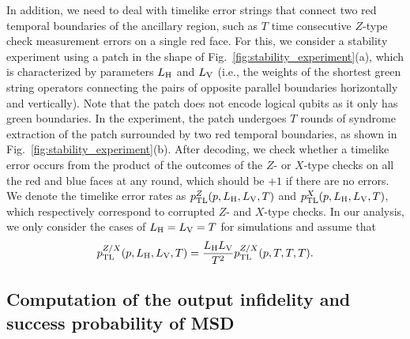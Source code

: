 \documentclass[
 prx,
 reprint,
 superscriptaddress,
 longbibliography,
 dvipsnames
]{revtex4-2}
\begin{document}
In addition, we need to deal with timelike error strings that connect two red temporal boundaries of the ancillary region, such as $T$ time consecutive $Z$-type check measurement errors on a single red face.
For this, we consider a stability experiment \cite{gidney2022stability} using a patch in the shape of Fig.~\ref{fig:stability_experiment}(a), which is characterized by parameters $L_{\mathrm{H}}$ and $L_{\mathrm{V}}$ (i.e., the weights of the shortest green string operators connecting the pairs of opposite parallel boundaries horizontally and vertically).
Note that the patch does not encode logical qubits as it only has green boundaries.
In the experiment, the patch undergoes $T$ rounds of syndrome extraction of the patch surrounded by two red temporal boundaries, as shown in Fig.~\ref{fig:stability_experiment}(b).
After decoding, we check whether a timelike error occurs from the product of the outcomes of the $Z$- or $X$-type checks on all the red and blue faces at any round, which should be $+1$ if there are no errors.
We denote the timelike error rates as $p_{\mathrm{TL}}^{Z}(p, L_{\mathrm{H}}, L_{\mathrm{V}}, T)$ and $p_{\mathrm{TL}}^{X}(p, L_{\mathrm{H}}, L_{\mathrm{V}}, T)$, which respectively correspond to corrupted $Z$- and $X$-type checks.
In our analysis, we only consider the cases of $L_{\mathrm{H}} = L_{\mathrm{V}} = T$ for simulations and assume that 
\begin{align*}
    p_{\mathrm{TL}}^{Z/X}(p, L_{\mathrm{H}}, L_{\mathrm{V}}, T) = \frac{L_{\mathrm{H}} L_{\mathrm{V}}}{T^2} p_{\mathrm{TL}}^{Z/X}(p, T, T, T).
\end{align*}


\subsection{Computation of the output infidelity and success probability of MSD}
\end{document}
